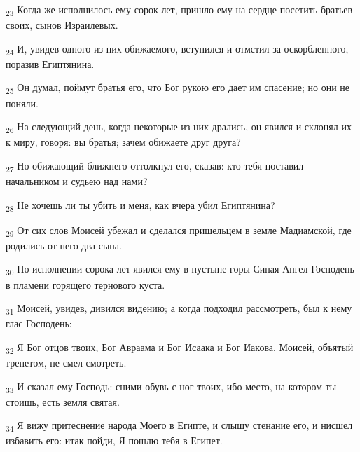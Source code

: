 \begin{tcolorbox}
\textsubscript{23} Когда же исполнилось ему сорок лет, пришло ему на сердце посетить братьев своих, сынов Израилевых.
\end{tcolorbox}
\begin{tcolorbox}
\textsubscript{24} И, увидев одного из них обижаемого, вступился и отмстил за оскорбленного, поразив Египтянина.
\end{tcolorbox}
\begin{tcolorbox}
\textsubscript{25} Он думал, поймут братья его, что Бог рукою его дает им спасение; но они не поняли.
\end{tcolorbox}
\begin{tcolorbox}
\textsubscript{26} На следующий день, когда некоторые из них дрались, он явился и склонял их к миру, говоря: вы братья; зачем обижаете друг друга?
\end{tcolorbox}
\begin{tcolorbox}
\textsubscript{27} Но обижающий ближнего оттолкнул его, сказав: кто тебя поставил начальником и судьею над нами?
\end{tcolorbox}
\begin{tcolorbox}
\textsubscript{28} Не хочешь ли ты убить и меня, как вчера убил Египтянина?
\end{tcolorbox}
\begin{tcolorbox}
\textsubscript{29} От сих слов Моисей убежал и сделался пришельцем в земле Мадиамской, где родились от него два сына.
\end{tcolorbox}
\begin{tcolorbox}
\textsubscript{30} По исполнении сорока лет явился ему в пустыне горы Синая Ангел Господень в пламени горящего тернового куста.
\end{tcolorbox}
\begin{tcolorbox}
\textsubscript{31} Моисей, увидев, дивился видению; а когда подходил рассмотреть, был к нему глас Господень:
\end{tcolorbox}
\begin{tcolorbox}
\textsubscript{32} Я Бог отцов твоих, Бог Авраама и Бог Исаака и Бог Иакова. Моисей, объятый трепетом, не смел смотреть.
\end{tcolorbox}
\begin{tcolorbox}
\textsubscript{33} И сказал ему Господь: сними обувь с ног твоих, ибо место, на котором ты стоишь, есть земля святая.
\end{tcolorbox}
\begin{tcolorbox}
\textsubscript{34} Я вижу притеснение народа Моего в Египте, и слышу стенание его, и нисшел избавить его: итак пойди, Я пошлю тебя в Египет.
\end{tcolorbox}
